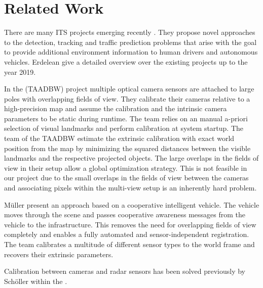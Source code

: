 \section{Related Work}
There are many ITS projects emerging recently  \cite{koster2017testfeld,arnold2020cooperative,arnoldCooperativePerception,agrawal2008censure}. 
They propose novel approaches to the detection, tracking and traffic prediction problems that arise with the goal to provide additional environment information to human drivers and autonomous vehicles.
Erdelean \etal{} \cite{erdelean2019catalogue} give a detailed overview over the existing projects up to the year 2019.

In the \TAADBW{} (TAADBW) project multiple optical camera sensors are attached to large poles with overlapping fields of view.
They calibrate their cameras relative to a high-precision map and assume the calibration and the intrinsic camera parameters to be static during runtime. 
The team relies on an manual a-priori selection of visual landmarks and perform calibration at system startup.  
The team of the TAADBW estimate the extrinsic calibration with exact world position from the map by minimizing the squared distances between the visible landmarks and the respective projected objects.
The large overlaps in the fields of view in their setup allow a global optimization strategy. 
This is not feasible in our project due to the small overlaps in the fields of view between the cameras \cite{kraemmer2020providentia} and associating pixels within the multi-view setup is an inherently hard problem. 

Müller \etal{} \cite{laciMueller} present an approach based on a cooperative intelligent vehicle.
The vehicle moves through the scene and passes cooperative awareness messages from the vehicle to the infrastructure. 
This removes the need for overlapping fields of view completely and enables a fully automated and sensor-independent registration.
The team calibrates a multitude of different sensor types to the world frame and recovers their extrinsic parameters. 

Calibration between cameras and radar sensors has been solved previously by Schöller \etal{} within the \Providentia{}.

